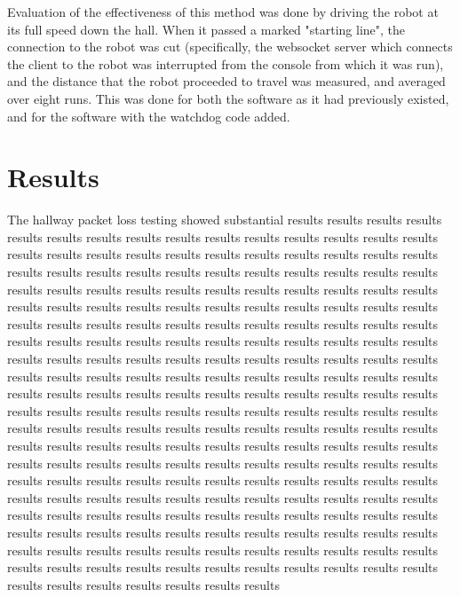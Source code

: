 \documentclass{IEEEtran}
\begin{document}
Evaluation of the effectiveness of this method was done by driving the robot
at its full speed down the hall. When it passed a marked "starting line",
the connection to the robot was cut (specifically, the websocket server which
connects the client to the robot was interrupted from the console from which
it was run), and the distance that the robot proceeded to travel was measured, 
and averaged over eight runs. This was done for both the software as it had
previously existed, and for the software with the watchdog code added.

\section{Results}
The hallway packet loss testing showed substantial results 
results results results results results results results results results results
results results results results results results results results results results
results results results results results results results results results results
results results results results results results results results results results
results results results results results results results results results results
results results results results results results results results results results
results results results results results results results results results results
results results results results results results results results results results
results results results results results results results results results results
results results results results results results results results results results
results results results results results results results results results results
results results results results results results results results results results
results results results results results results results results results results
results results results results results results results results results results
results results results results results results results results results results
results results results results results results results results results results
results results results results results results results results results results
results results results results results results results results results results
results results results results results results results results results results
results results results results results results results results results results
results results results results results results results results results results
results results results results results results results results results results
results results results results results results results results results results
\end{document}
